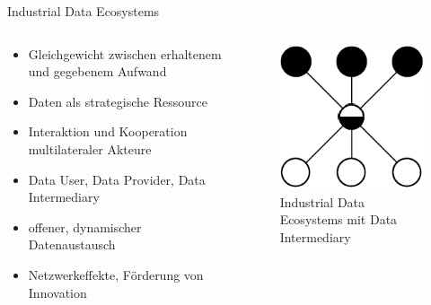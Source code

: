 \begin{frame}{Industrial Data Ecosystems \footnotesize\cite{mollerIndustrialDataEcosystems2024}}
    \begin{columns}
        \begin{column}{0.6\textwidth}
            \begin{itemize}
                \item Gleichgewicht zwischen erhaltenem und gegebenem Aufwand
                \item Daten als strategische Ressource %
                \item Interaktion und Kooperation \alert{multilateraler} Akteure
                \item Data User, Data Provider, Data Intermediary
                \item offener, dynamischer Datenaustausch
                \item Netzwerkeffekte, Förderung von Innovation
            \end{itemize}
        \end{column}

        \begin{column}{0.4\textwidth}
            \begin{figure}
                \centering
                \includegraphics[height=0.5\textheight]{./assets/industrial_de_architecture.drawio.pdf}
                \caption{Industrial Data Ecosystems mit Data Intermediary}
            \end{figure}
        \end{column}
    \end{columns}
\end{frame}


